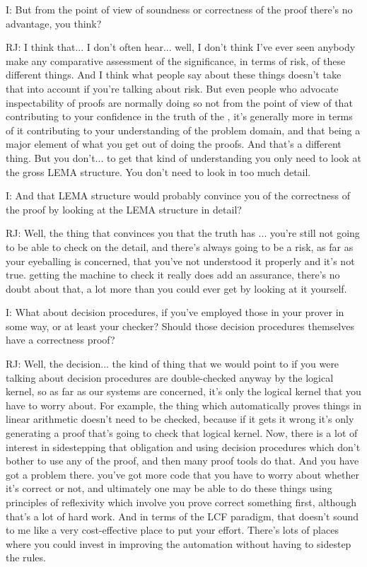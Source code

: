 \documentclass[10pt,titlepage]{book}
\begin{document}
I: But from the point of view of soundness or correctness of the proof there's no advantage, you think?

RJ: I think that... I don't often hear... well, I don't think I've ever seen anybody make any comparative assessment of the significance, in terms of risk, of these different things. And I think what people say about these things doesn't take that into account if you're talking about risk. But even people who advocate inspectability of proofs are normally doing so not from the point of view of that contributing to your confidence in the truth of the 	, it's generally more in terms of it contributing to your understanding of the problem domain, and that being a major element of what you get out of doing the proofs. And that's a different thing. But you don't... to get that kind of understanding you only need to look at the gross LEMA structure. You don't need to look in too much detail.

I: And that LEMA structure would probably convince you of the correctness of the proof by looking at the LEMA structure in detail?

RJ: Well, the thing that convinces you that the truth has		...  you're still not going to be able to check on the detail, and there's always going to be a risk, as far as your eyeballing is concerned, that you've not understood it properly and it's not true.  getting the machine to check it really does add an assurance, there's no doubt about that, a lot more than you could ever get by looking at it yourself.

I: What about decision procedures, if you've employed those in your prover in some way, or at least your checker? Should those decision procedures themselves have a correctness proof?

RJ: Well, the decision... the kind of thing that we would point to if you were talking about decision procedures are double-checked anyway by the logical kernel, so as far as our systems are concerned, it's only the logical kernel that you have to worry about. For example, the thing which automatically proves things in linear arithmetic doesn't need to be checked, because if it gets it wrong it's only generating a proof that's going to check that logical kernel. Now, there is a lot of interest in sidestepping that obligation and using decision procedures which don't bother to use any of the proof, and then many proof tools do that. And you have got a problem there.  you've got more code that you have to worry about whether it's correct or not, and ultimately one may be able to do these things using principles of reflexivity which involve you prove correct something first, although that's a lot of hard work. And in terms of the LCF paradigm, that doesn't sound to me like a very cost-effective place to put your effort. There's lots of places where you could invest in improving the automation without having to sidestep the 	rules.
\end{document}
